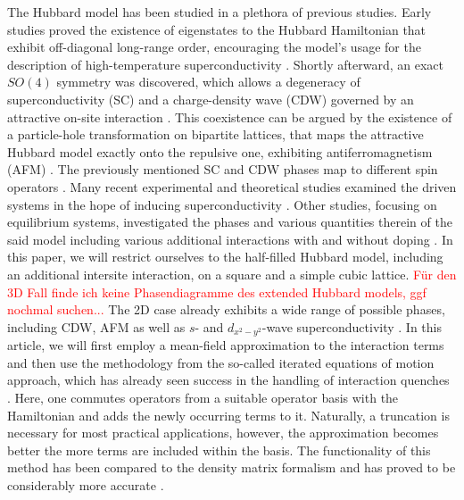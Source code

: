\documentclass[
    reprint, 
    aps,
    preprintnumbers,
    twocolumn,
    prb,
    superscriptaddress
]{revtex4-2}
\begin{document}
The Hubbard model has been studied in a plethora of previous studies. 
Early studies proved the existence of eigenstates to the Hubbard Hamiltonian that exhibit off-diagonal long-range order,
encouraging the model's usage for the description of high-temperature superconductivity \cite{yang89}.
Shortly afterward, an exact $SO(4)$ symmetry was discovered,
which allows a degeneracy of superconductivity (SC) and a charge-density wave (CDW) governed by an attractive on-site interaction \cite{yang90}.
This coexistence can be argued by the existence of a particle-hole transformation on bipartite lattices, 
that maps the attractive Hubbard model exactly onto the repulsive one, exhibiting antiferromagnetism (AFM) \cite{Hirsch85}.
The previously mentioned SC and CDW phases map to different spin operators \cite{zitko15,lieb89}.
\newline
Many recent experimental and theoretical studies examined the driven systems in the hope of inducing superconductivity 
\cite{Nicoletti14,Krull14,Moor14,Casandruc15,patel16,sentef17,Buenemann17}.
Other studies, focusing on equilibrium systems, 
investigated the phases and various quantities therein of the said model including various additional interactions with and without doping 
\cite{Micnas88,Micnas88b,Micnas89,Dzierzawa92,Kostyrko92,Eriksson95,Staudt00,Onari04,Toschi05,Brackett16,Paki19,romer20,Sushchyev22}.
\newline
In this paper, we will restrict ourselves to the half-filled Hubbard model, including an additional intersite interaction, on a square and a simple cubic lattice.
\textcolor{red}{Für den 3D Fall finde ich keine Phasendiagramme des extended Hubbard models, ggf nochmal suchen...}
The 2D case already exhibits a wide range of possible phases, including CDW, AFM as well as $s$- and $d_{x^2 - y^2}$-wave superconductivity
\cite{Micnas88b,Tsuchiura95,Su01,Su04,ha11,Huang13,Jiang22}.
\newline
In this article, we will first employ a mean-field approximation to the interaction terms 
and then use the methodology from the so-called iterated equations of motion approach,
which has already seen success in the handling of interaction quenches \cite{uhrig09,hamerla13,hamerla14,bleicker18}.
Here, one commutes operators from a suitable operator basis with the Hamiltonian and adds the newly occurring terms to it.
Naturally, a truncation is necessary for most practical applications, however, the approximation becomes better the more terms are included within the basis.
The functionality of this method has been compared to the density matrix formalism and has proved to be considerably more accurate \cite{Kalthoff17}.
\end{document}
